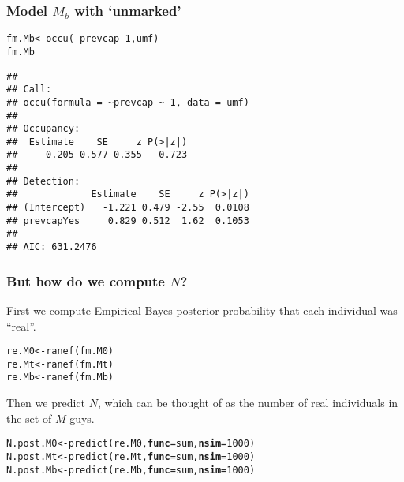 \documentclass[color=usenames,dvipsnames]{beamer}\usepackage[]{graphicx}\usepackage[]{color}
\makeatletter
\newcommand{\hlnum}[1]{\textcolor[rgb]{0.69,0.494,0}{#1}}%
\newcommand{\hlopt}[1]{\textcolor[rgb]{0,0,0}{#1}}%
\newcommand{\hlstd}[1]{\textcolor[rgb]{0,0,0}{#1}}%
\newcommand{\hlkwb}[1]{\textcolor[rgb]{0,0.341,0.682}{#1}}%
\newcommand{\hlkwc}[1]{\textcolor[rgb]{0,0,0}{\textbf{#1}}}%
\newcommand{\hlkwd}[1]{\textcolor[rgb]{0.004,0.004,0.506}{#1}}%
\newenvironment{kframe}{%
 \def\at@end@of@kframe{}%
 \ifinner\ifhmode%
  \def\at@end@of@kframe{\end{minipage}}%
  \begin{minipage}{\columnwidth}%
 \fi\fi%
 \def\FrameCommand##1{\hskip\@totalleftmargin \hskip-\fboxsep
 \colorbox{shadecolor}{##1}\hskip-\fboxsep
     \hskip-\linewidth \hskip-\@totalleftmargin \hskip\columnwidth}%
 \MakeFramed {\advance\hsize-\width
   \@totalleftmargin\z@ \linewidth\hsize
   \@setminipage}}%
 {\par\unskip\endMakeFramed%
 \at@end@of@kframe}
\newenvironment{knitrout}{}{} %
\makeatother
\begin{document}
\begin{frame}[fragile]
  \frametitle{Model $M_b$ with `unmarked'}
\begin{knitrout}\scriptsize
{}\color{fgcolor}\begin{kframe}
\begin{alltt}
\hlstd{fm.Mb} \hlkwb{<-} \hlkwd{occu}\hlstd{(}\hlopt{~}\hlstd{prevcap}\hlopt{~}\hlnum{1}\hlstd{, umf)}
\hlstd{fm.Mb}
\end{alltt}
\begin{verbatim}
## 
## Call:
## occu(formula = ~prevcap ~ 1, data = umf)
## 
## Occupancy:
##  Estimate    SE     z P(>|z|)
##     0.205 0.577 0.355   0.723
## 
## Detection:
##             Estimate    SE     z P(>|z|)
## (Intercept)   -1.221 0.479 -2.55  0.0108
## prevcapYes     0.829 0.512  1.62  0.1053
## 
## AIC: 631.2476
\end{verbatim}
\end{kframe}
\end{knitrout}
\end{frame}


\begin{frame}[fragile]
  \frametitle{But how do we compute $N$?}
  First we compute Empirical Bayes posterior probability that each
  individual was ``real''. 
\begin{knitrout}\small
{}\color{fgcolor}\begin{kframe}
\begin{alltt}
\hlstd{re.M0} \hlkwb{<-} \hlkwd{ranef}\hlstd{(fm.M0)}
\hlstd{re.Mt} \hlkwb{<-} \hlkwd{ranef}\hlstd{(fm.Mt)}
\hlstd{re.Mb} \hlkwb{<-} \hlkwd{ranef}\hlstd{(fm.Mb)}
\end{alltt}
\end{kframe}
\end{knitrout}
\pause
\vfill
Then we predict $N$, which can be thought of as the number of real
individuals in the set of $M$ guys.
\begin{knitrout}\small
{}\color{fgcolor}\begin{kframe}
\begin{alltt}
\hlstd{N.post.M0} \hlkwb{<-} \hlkwd{predict}\hlstd{(re.M0,} \hlkwc{func}\hlstd{=sum,} \hlkwc{nsim}\hlstd{=}\hlnum{1000}\hlstd{)}
\hlstd{N.post.Mt} \hlkwb{<-} \hlkwd{predict}\hlstd{(re.Mt,} \hlkwc{func}\hlstd{=sum,} \hlkwc{nsim}\hlstd{=}\hlnum{1000}\hlstd{)}
\hlstd{N.post.Mb} \hlkwb{<-} \hlkwd{predict}\hlstd{(re.Mb,} \hlkwc{func}\hlstd{=sum,} \hlkwc{nsim}\hlstd{=}\hlnum{1000}\hlstd{)}
\end{alltt}
\end{kframe}
\end{knitrout}
\end{frame}
\end{document}
